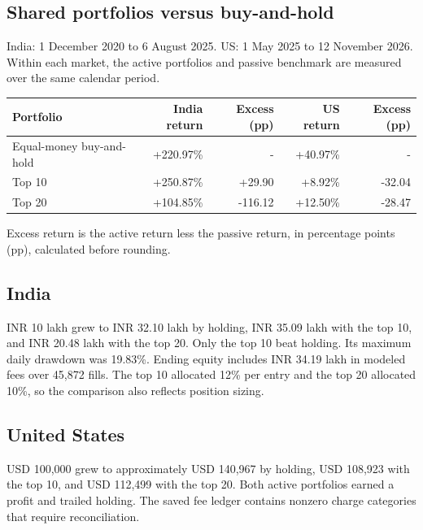 \documentclass[12pt,a4paper,twoside,openany]{report}
\begin{document}
\subsection{Shared portfolios versus buy-and-hold}\label{exp:9.1}
India: 1 December 2020 to 6 August 2025. US: 1 May 2025 to 12 November 2026. Within each market, the active portfolios and passive benchmark are measured over the same calendar period.\par
\begin{tabular*}{\linewidth}{@{\extracolsep{\fill}}lrrrr@{}}\toprule
Portfolio & India return & Excess (pp) & US return & Excess (pp)\\\midrule
Equal-money buy-and-hold & +220.97\% & - & +40.97\% & -\\
Top 10 & +250.87\% & +29.90 & +8.92\% & -32.04\\
Top 20 & +104.85\% & -116.12 & +12.50\% & -28.47\\
\bottomrule\end{tabular*}\par
Excess return is the active return less the passive return, in percentage points (pp), calculated before rounding.\par
\subsection*{India}
INR 10 lakh grew to INR 32.10 lakh by holding, INR 35.09 lakh with the top 10, and INR 20.48 lakh with the top 20. Only the top 10 beat holding. Its maximum daily drawdown was 19.83\%. Ending equity includes INR 34.19 lakh in modeled fees over 45,872 fills. The top 10 allocated 12\% per entry and the top 20 allocated 10\%, so the comparison also reflects position sizing.\par
\subsection*{United States}
USD 100,000 grew to approximately USD 140,967 by holding, USD 108,923 with the top 10, and USD 112,499 with the top 20. Both active portfolios earned a profit and trailed holding. The saved fee ledger contains nonzero charge categories that require reconciliation.\par
\end{document}
